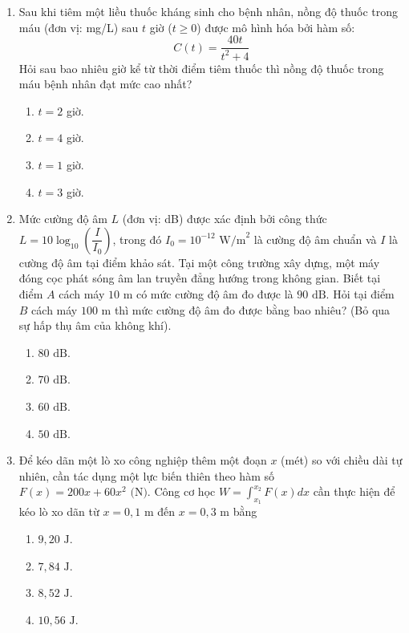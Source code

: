 \documentclass[12pt,a4paper]{article}
\begin{document}
\begin{enumerate}[label=\textbf{Câu \arabic*:}, leftmargin=*]

\item
\begin{minipage}[t]{\linewidth} 
Sau khi tiêm một liều thuốc kháng sinh cho bệnh nhân, nồng độ thuốc trong máu (đơn vị: mg/L) sau $t$ giờ ($t \ge 0$) được mô hình hóa bởi hàm số:
$$C(t) = \dfrac{40t}{t^2 + 4}$$
Hỏi sau bao nhiêu giờ kể từ thời điểm tiêm thuốc thì nồng độ thuốc trong máu bệnh nhân đạt mức cao nhất?
\begin{enumerate}[label=\Alph*., itemsep=0pt, topsep=3pt, parsep=0pt]
    \item $t = 2$ giờ.
    \item $t = 4$ giờ.
    \item $t = 1$ giờ.
    \item $t = 3$ giờ.
\end{enumerate}
\end{minipage}

\item
\begin{minipage}[t]{\linewidth} 
Mức cường độ âm $L$ (đơn vị: dB) được xác định bởi công thức $L = 10 \log_{10}\left(\dfrac{I}{I_0}\right)$, trong đó $I_0 = 10^{-12}\text{ W/m}^2$ là cường độ âm chuẩn và $I$ là cường độ âm tại điểm khảo sát. Tại một công trường xây dựng, một máy đóng cọc phát sóng âm lan truyền đẳng hướng trong không gian. Biết tại điểm $A$ cách máy $10\text{ m}$ có mức cường độ âm đo được là $90\text{ dB}$. Hỏi tại điểm $B$ cách máy $100\text{ m}$ thì mức cường độ âm đo được bằng bao nhiêu? (Bỏ qua sự hấp thụ âm của không khí).
\begin{enumerate}[label=\Alph*., itemsep=0pt, topsep=3pt, parsep=0pt]
    \item $80\text{ dB}$.
    \item $70\text{ dB}$.
    \item $60\text{ dB}$.
    \item $50\text{ dB}$.
\end{enumerate}
\end{minipage}

\item
\begin{minipage}[t]{\linewidth} 
Để kéo dãn một lò xo công nghiệp thêm một đoạn $x$ (mét) so với chiều dài tự nhiên, cần tác dụng một lực biến thiên theo hàm số $F(x) = 200x + 60x^2\text{ (N)}$. Công cơ học $W = \int_{x_1}^{x_2} F(x) dx$ cần thực hiện để kéo lò xo dãn từ $x = 0{,}1\text{ m}$ đến $x = 0{,}3\text{ m}$ bằng
\begin{enumerate}[label=\Alph*., itemsep=0pt, topsep=3pt, parsep=0pt]
    \item $9{,}20\text{ J}$.
    \item $7{,}84\text{ J}$.
    \item $8{,}52\text{ J}$.
    \item $10{,}56\text{ J}$.
\end{enumerate}
\end{minipage}


\end{enumerate}
\end{document}

